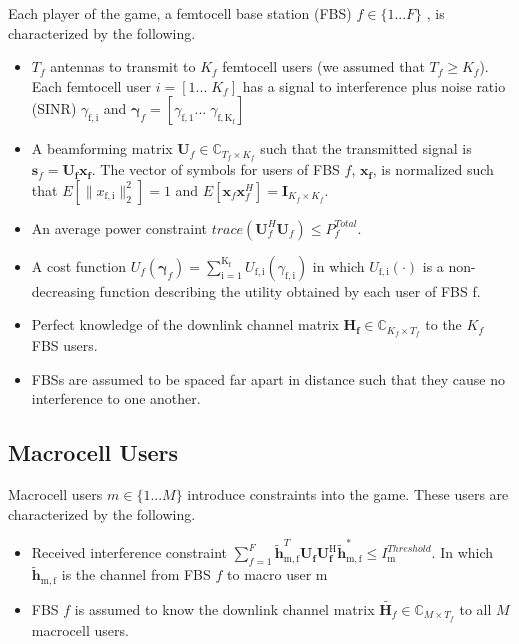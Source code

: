 \documentclass[12pt,a4paper]{report}
\begin{document}
Each player of the game, a femtocell base station (FBS) $f \in \{1 ... F\}$ , is characterized by the following.
\begin{itemize}
\item 
$T_{f}$ antennas to transmit to $K_{f}$ femtocell users (we assumed that $T_{f} \geq K_{f}$). Each femtocell user $i = [1... \;K_{f}]$ has a signal to interference plus noise ratio (SINR) $\gamma_{\mathrm{f,i}}$ and $\mathbf{\gamma}_{f} = [\gamma_{\mathrm{f,1}}...\; \gamma_{\mathrm{f,K_{f}}}]$
\\
\item 
	A beamforming matrix $\mathbf{U}_{f} \in \mathbb{C}_{T_{f} \times K_{f}}$ such that the transmitted 		
	signal is $\mathbf{s}_{f
	}= \mathbf{U_{f}}\mathbf{x_{f}}$. The 		
	vector of symbols for users of FBS $f$, $\mathbf{x_{f}}$, is  normalized such that $E[\|x_{\mathrm{f,i}}
	\|_2^2]=1$ and $E[\mathbf{x}_{f}\mathbf{x}_{f}^H]=\mathbf{I}_{K_{f} \times K_{f}}$.
\\
\item 
	An average power constraint $trace(\mathbf{U}_{f}^H\mathbf{U}_{f}) \leq P^{Total}_{f} $.

\item 
	A cost function $U_{f}(\mathbf{\gamma}_{f}) =
	\sum_{\mathrm{i=1}}^{\mathrm{K_{f}}}
    	 U_{\mathrm{f,i}}(\gamma_{\mathrm{f,i}}) $
    	in which $U_{\mathrm{f,i}}(\cdot)$ is a non-decreasing function describing the utility obtained by each user of FBS f.

\item 
	Perfect knowledge of the downlink channel matrix $\mathbf{H_f} \in \mathbb{C}_{K_{f} \times T_{f}} $ to the $K_{f}$ FBS users.
\\
\item
	 FBSs are assumed to be spaced far apart in distance such that they cause no interference to one another.
\end{itemize}

\subsection{Macrocell Users}
Macrocell users $m \in \{1 ... M\}$ introduce constraints into the game. These users are characterized by the following.

\begin{itemize}
\item 
	Received interference constraint
	$\sum^F_{f=1} \mathbf{\tilde{h}}_{\mathrm{m,f}}^T  \mathbf{U_{f}} 						
	\mathbf{U_{f}^{\mathrm{H}}} \mathbf{\tilde{h}_{\mathrm{m,f}}^*} \leq I^{Threshold}		
	_{\mathrm{m}} $. In which $\mathbf{\tilde{h}}_{\mathrm{m,f}}$ is the channel from FBS $f$ to macro user $\text{m}$

\item 
	FBS $f$ is assumed to know the downlink channel matrix $\tilde{\mathbf{H}_{f}} \in \mathbb{C}_{M \times T_{f}}$ to all $M$ macrocell users.
\\
\end{itemize}
\end{document}
